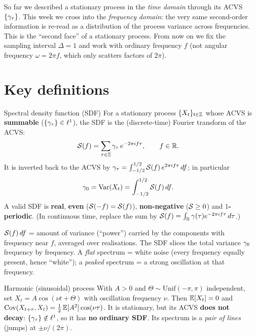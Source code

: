 \documentclass[11pt]{article}
\begin{document}

So far we described a stationary process in the \emph{time domain} through its ACVS $\{\gamma_\tau\}$. This week we cross into the \emph{frequency domain}: the very same second-order information is re-read as a distribution of the process variance across frequencies. This is the ``second face'' of a stationary process. From now on we fix the sampling interval $\Delta=1$ and work with ordinary frequency $f$ (not angular frequency $\omega=2\pi f$, which only scatters factors of $2\pi$).

\section*{Key definitions}

\begin{defn}{Spectral density function (SDF)}
For a stationary process $\{X_t\}_{t\in\mathbb{Z}}$ whose ACVS is \textbf{summable} ($\{\gamma_\tau\}\in\ell^1$), the SDF is the (discrete-time) Fourier transform of the ACVS:
\[
\mathcal{S}(f)=\sum_{\tau\in\mathbb{Z}}\gamma_\tau\,e^{-2\pi i f\tau},\qquad f\in\mathbb{R} .
\]
It is inverted back to the ACVS by $\gamma_\tau=\int_{-1/2}^{1/2}\mathcal{S}(f)\,e^{2\pi i f\tau}\,df$; in particular
\[
\gamma_0=\operatorname{Var}(X_t)=\int_{-1/2}^{1/2}\mathcal{S}(f)\,df .
\]
A valid SDF is \textbf{real}, \textbf{even} ($\mathcal{S}(-f)=\mathcal{S}(f)$), \textbf{non-negative} ($\mathcal{S}\ge0$) and \textbf{$1$-periodic}. (In continuous time, replace the sum by $\mathcal{S}(f)=\int_{\mathbb{R}}\gamma(\tau)e^{-2\pi i f\tau}\,d\tau$.)
\end{defn}

\begin{intu}
$\mathcal{S}(f)\,df$ = amount of variance (``power'') carried by the components with frequency near $f$, averaged over realisations. The SDF slices the total variance $\gamma_0$ frequency by frequency. A \emph{flat} spectrum = white noise (every frequency equally present, hence ``white''); a \emph{peaked} spectrum = a strong oscillation at that frequency.
\end{intu}

\begin{defn}{Harmonic (sinusoidal) process}
With $A>0$ and $\Theta\sim\mathrm{Unif}(-\pi,\pi)$ independent, set $X_t=A\cos(\nu t+\Theta)$ with oscillation frequency $\nu$. Then $\mathbb{E}[X_t]=0$ and $\operatorname{Cov}(X_{t+\tau},X_t)=\tfrac12\,\mathbb{E}[A^2]\cos(\nu\tau)$. It is stationary, but its ACVS \textbf{does not decay}: $\{\gamma_\tau\}\notin\ell^1$, so it has \textbf{no ordinary SDF}. Its spectrum is a \emph{pair of lines} (jumps) at $\pm\nu/(2\pi)$.
\end{defn}
\end{document}

